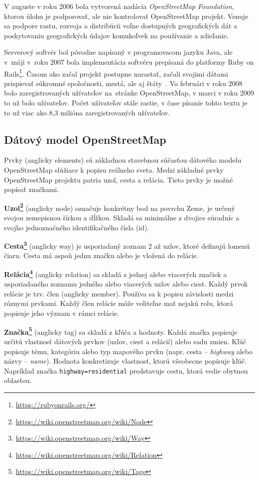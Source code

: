 V auguste v roku 2006 bola vytvorená nadácia \emph{OpenStreetMap Foundation}, ktorou úlohu je podporovať, ale nie kontrolovať OpenStreetMap projekt. Venuje sa podpore rastu, rozvoja a distribúcii voľne dostupných geografických dát a poskytovaniu geografických údajov komukoľvek na používanie a zdieľanie.

Serverový softvér bol pôvodne napísaný v programovacom jazyku Java, ale v~máji v~roku 2007 bola implementácia softvéru prepísaná do platformy Ruby on Rails\footnote{\url{https://rubyonrails.org/}}. Časom ako začal projekt postupne narastať, začali svojimi dátami prispievať súkromné spoločnosti, mestá, ale aj štáty~\cite{bennett2010openstreetmap}. Vo februári v roku 2008 bolo zaregistrovaných  užívateľov na~stránke OpenStreetMap, v marci v roku 2009 to už bolo  užívateľov. Počet užívateľov stále rastie, v čase písanie tohto textu je to už viac ako 8,3 milióna zaregistrovaných užívateľov.

\subsection{Dátový model OpenStreetMap}
Prvky (anglicky elements) sú základnou stavebnou súčasťou dátového modelu OpenStreetMap slúžiace k popisu reálneho sveta. Medzi základné prvky OpenStreetMap projektu patria uzol, cesta a relácia. Tieto prvky je možné popísať značkami.

\textbf{Uzol\footnote{\url{https://wiki.openstreetmap.org/wiki/Node}}} (anglicky node) označuje konkrétny bod na povrchu Zeme, je určený svojou zemepisnou šírkou a dĺžkou. Skladá sa minimálne z dvojice súradníc a svojho jednoznačného identifikačného čísla (id).

\textbf{Cesta\footnote{\url{https://wiki.openstreetmap.org/wiki/Way}}} (anglicky way) je usporiadaný zoznam 2 až  uzlov, ktoré definujú lomenú čiaru. Cesta má aspoň jednu značku alebo je vložená do relácie.

\textbf{Relácia\footnote{\url{https://wiki.openstreetmap.org/wiki/Relation}}} (anglicky relation) sa skladá z jednej alebo viacerých značiek a usporiadaného zoznamu jedného alebo viacerých uzlov alebo ciest. Každý prvok relácie je tzv. člen (anglicky member). Používa sa k popisu závislosti medzi rôznymi prvkami. Každý člen relácie môže voliteľne mať nejakú rolu, ktorá popisuje jeho význam v rámci relácie.

\textbf{Značka\footnote{\url{https://wiki.openstreetmap.org/wiki/Tags}}} (anglicky tag) sa skladá z kľúča a hodnoty. Každá značka popisuje určitú vlastnosť dátových prvkov (uzlov, ciest a relácií) alebo sadu zmien. Kľúč popisuje tému, kategóriu alebo typ mapového prvku (napr. cesta \--- \emph{highway} alebo názvy \--- \emph{name}). Hodnota konkretizuje vlastnosť, ktorú všeobecne popisuje kľúč. Napríklad značka \texttt{highway=residential} predstavuje cestu, ktorá vedie obytnou oblasťou.


